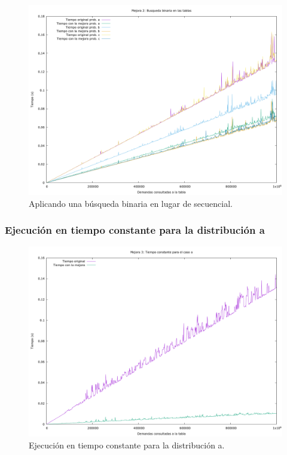 \documentclass[12pt, spanish]{article}
\begin{document}
\begin{figure}[H]
	\centering
	\includegraphics[scale = 0.2]{t_mejora2.png}
	\caption{Aplicando una búsqueda binaria en lugar de secuencial.}
	\label{fig:ej1_a_150000}

\end{figure}

\subsubsection{Ejecución en tiempo constante para la distribución a}


\begin{figure}[H]
	\centering
	\includegraphics[scale = 0.2]{t_mejora3.png}
	\caption{Ejecución en tiempo constante para la distribución a.}
	\label{fig:ej1_a_150000}

\end{figure}
\end{document}
